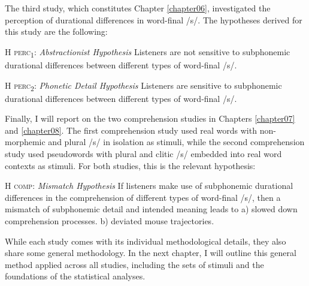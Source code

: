 The third study, which constitutes Chapter \ref{chapter06}, investigated the perception of durational differences in word-final /s/. The hypotheses derived for this study are the following:

\begin{description}
\item\textsc{H perc\textsubscript{1}}: \textit{Abstractionist Hypothesis} \newline
Listeners are not sensitive to subphonemic durational differences between different types of word-final /s/.

\item\textsc{H perc\textsubscript{2}}: \textit{Phonetic Detail Hypothesis} \newline
Listeners are sensitive to subphonemic durational differences between different types of word-final /s/.
\end{description}

Finally, I will report on the two comprehension studies in Chapters \ref{chapter07} and \ref{chapter08}. The first comprehension study used real words with non-morphemic and plural /s/ in isolation as stimuli, while the second comprehension study used pseudowords with plural and clitic /s/ embedded into real word contexts as stimuli. For both studies, this is the relevant hypothesis:

\begin{description}

\item\textsc{H comp}: \textit{Mismatch Hypothesis} \newline
If listeners make use of subphonemic durational differences in the comprehension of different types of word-final /s/, then a mismatch of subphonemic detail and intended meaning leads to\newline
a) slowed down comprehension processes.\newline
b) deviated mouse trajectories.

\end{description}

While each study comes with its individual methodological details, they also share some general methodology. In the next chapter, I will outline this general method applied across all studies, including the sets of stimuli and the foundations of the statistical analyses.

